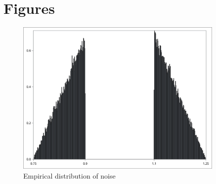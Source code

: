 \clearpage
\section*{Figures}

\begin{figure}[h!]
	\centering
	\caption{Empirical distribution of noise\label{fig:fuzzgraph}}
	\includegraphics[width=0.9\textwidth]{SGPlotHiDef.png}
\end{figure}

